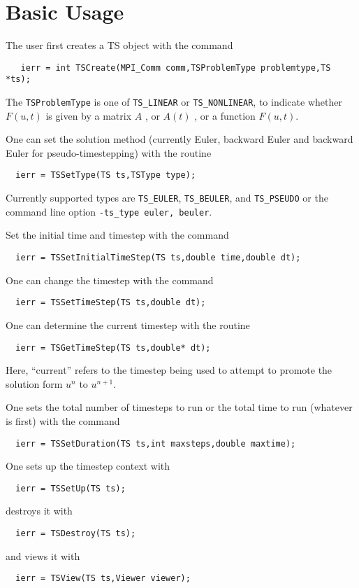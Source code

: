 \section{Basic Usage}

The user first creates a TS object with the command
\begin{verbatim}
   ierr = int TSCreate(MPI_Comm comm,TSProblemType problemtype,TS *ts);
\end{verbatim}
 The {\tt TSProblemType} 
is one of {\tt TS\_LINEAR} or {\tt TS\_NONLINEAR},
to indicate whether $ F(u,t) $ is given by a matrix $ A $ , or $ A(t) $ , or a
function $ F(u,t). $

One can set the solution method (currently Euler, backward Euler
and backward Euler for pseudo-timestepping) with the routine
\begin{verbatim}
  ierr = TSSetType(TS ts,TSType type);
\end{verbatim}
 Currently supported types are {\tt TS\_EULER},
{\tt TS\_BEULER}, and {\tt TS\_PSEUDO}
  
or the command line option
{\tt -ts\_type euler, beuler}.  


Set the initial time and timestep with the command
\begin{verbatim}
  ierr = TSSetInitialTimeStep(TS ts,double time,double dt);
\end{verbatim}
One  can change the timestep with the command
\begin{verbatim}
  ierr = TSSetTimeStep(TS ts,double dt);
\end{verbatim}
One  
can  determine the current timestep with the routine
\begin{verbatim}
  ierr = TSGetTimeStep(TS ts,double* dt);
\end{verbatim}
Here, ``current'' refers to the timestep being used to attempt to
promote the solution form $ u^n $ to $ u^{n+1}. $

One sets the total number of timesteps to run or the total time to run 
(whatever is first) with the command 
\begin{verbatim}
  ierr = TSSetDuration(TS ts,int maxsteps,double maxtime);
\end{verbatim}
One sets up the timestep context with 
\begin{verbatim}
  ierr = TSSetUp(TS ts);
\end{verbatim}
destroys it with 
\begin{verbatim}
  ierr = TSDestroy(TS ts);
\end{verbatim}
and views it with 
\begin{verbatim}
  ierr = TSView(TS ts,Viewer viewer);
\end{verbatim}

